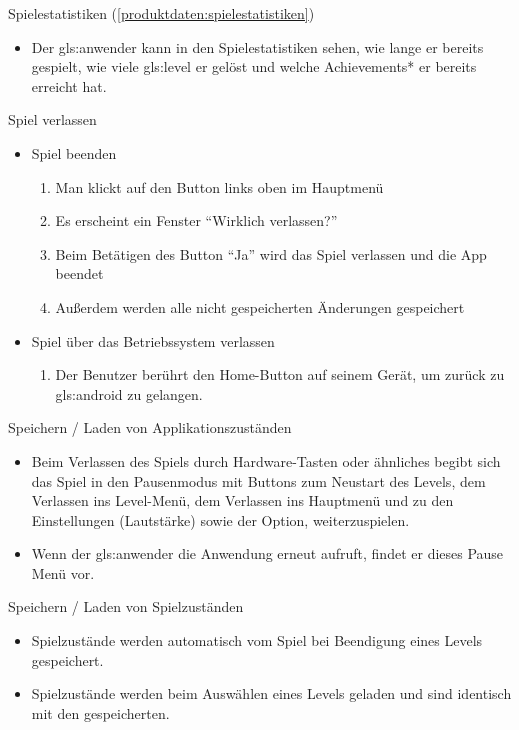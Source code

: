 \documentclass{scrartcl}
\begin{document}
\begin{telist}
	\item Spielestatistiken (\ref{produktdaten:spielestatistiken})
	\begin{itemize}
		\item Der \gls{gls:anwender} kann in den Spielestatistiken sehen, wie lange er bereits gespielt, wie viele \gls{gls:level} er gelöst und welche Achievements* er bereits erreicht hat.
	\end{itemize}
	
	\item{Spiel verlassen} \label{szenarien:quit_game}
	\begin{itemize}
		\item Spiel beenden
		\begin{enumerate}
			\item Man klickt auf den Button links oben im Hauptmenü
			\item Es erscheint ein Fenster \enquote{Wirklich verlassen?}
			\item Beim Betätigen des Button \enquote{Ja} wird das Spiel verlassen und die App beendet
			\item Außerdem werden alle nicht gespeicherten Änderungen gespeichert
		\end{enumerate}
		\item Spiel über das Betriebssystem verlassen
		\begin{enumerate}
			\item Der Benutzer berührt den Home-Button auf seinem Gerät, um zurück zu \gls{gls:android} zu gelangen.
		\end{enumerate}
	\end{itemize}
	
	\item Speichern / Laden von Applikationszuständen
	\begin{itemize}
		\item Beim Verlassen des Spiels durch Hardware-Tasten oder ähnliches begibt sich das Spiel in den Pausenmodus mit Buttons zum Neustart des Levels, dem Verlassen ins Level-Menü, dem Verlassen ins Hauptmenü und zu den Einstellungen (Lautstärke) sowie der Option, weiterzuspielen.
		\item Wenn der \gls{gls:anwender} die Anwendung erneut aufruft, findet er dieses Pause Menü vor.
	\end{itemize}
	
	\item Speichern / Laden von Spielzuständen
	\begin{itemize}
		\item Spielzustände werden automatisch vom Spiel bei Beendigung eines Levels gespeichert.
		\item Spielzustände werden beim Auswählen eines Levels geladen und sind identisch mit den gespeicherten.
	\end{itemize}
\end{telist}
\end{document}
